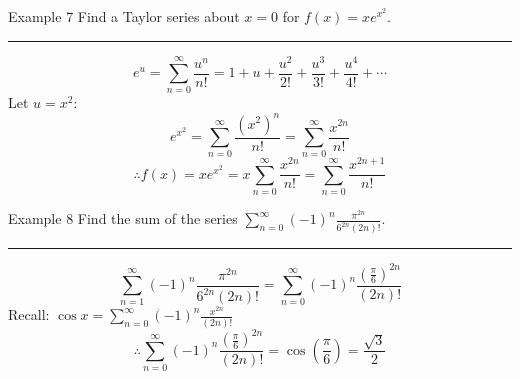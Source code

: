 \documentclass[12pt,a4paper]{article}
\begin{document}
\begin{eg}{Example 7}
	Find a Taylor series about $x=0$ for $f(x)=xe^{x^2}$.\\
	\noindent\rule[0.25\baselineskip]{\textwidth}{1pt}
	$$e^u=\sum^\infty_{n=0}\frac{u^n}{n!}=1+u+\frac{u^2}{2!}+\frac{u^3}{3!}+\frac{u^4}{4!}+\cdots$$
	Let $u=x^2$:
	$$e^{x^2}=\sum^\infty_{n=0}\frac{(x^2)^n}{n!}=\sum^\infty_{n=0}\frac{x^{2n}}{n!}$$
	$$\therefore f(x)=xe^{x^2}=x\sum^\infty_{n=0}\frac{x^{2n}}{n!}=\sum^\infty_{n=0}\frac{x^{2n+1}}{n!}$$
\end{eg}
\begin{eg}{Example 8}
	Find the sum of the series $\displaystyle\sum^\infty_{n=0}(-1)^n\frac{\pi^{2n}}{6^{2n}(2n)!}$.\\
	\noindent\rule[0.25\baselineskip]{\textwidth}{1pt}
	$$\sum^\infty_{n=1}(-1)^n\frac{\pi^{2n}}{6^{2n}(2n)!}=\sum^\infty_{n=0}(-1)^n\frac{\left(\frac{\pi}{6}\right)^{2n}}{(2n)!}$$
	Recall: $\displaystyle\cos{x}=\sum^\infty_{n=0}(-1)^n\frac{x^{2n}}{(2n)!}$
	$$\therefore\sum^\infty_{n=0}(-1)^n\frac{\left(\frac{\pi}{6}\right)^{2n}}{(2n)!}=\cos{\left(\frac{\pi}{6}\right)}=\frac{\sqrt{3}}{2}$$
\end{eg}
\end{document}
